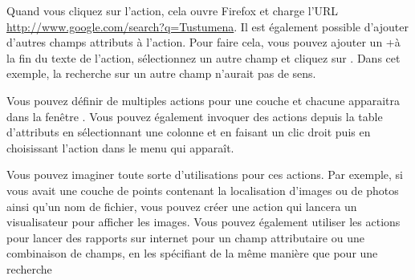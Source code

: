 Quand vous cliquez sur l'action, cela ouvre Firefox et charge l'URL \url{http://www.google.com/search?q=Tustumena}. Il est également possible d'ajouter d'autres champs attributs à l'action. Pour faire cela, vous pouvez ajouter un \og +\fg à la fin du texte de l'action, sélectionnez un autre champ et cliquez sur . Dans cet exemple, la recherche sur un autre champ n'aurait pas de sens.

Vous pouvez définir de multiples actions pour une couche et chacune apparaitra dans la fenêtre . Vous pouvez également invoquer des actions depuis la table d'attributs en sélectionnant une colonne et en faisant un clic droit puis en choisissant l'action dans le menu qui apparaît.

Vous pouvez imaginer toute sorte d'utilisations pour ces actions. Par exemple, si vous avait une couche de points contenant la localisation d'images ou de photos ainsi qu'un nom de fichier, vous pouvez créer une action qui lancera un visualisateur pour afficher les images. Vous pouvez également utiliser les actions pour lancer des rapports sur internet pour un champ attributaire ou une combinaison de champs, en les spécifiant de la même manière que pour une recherche

